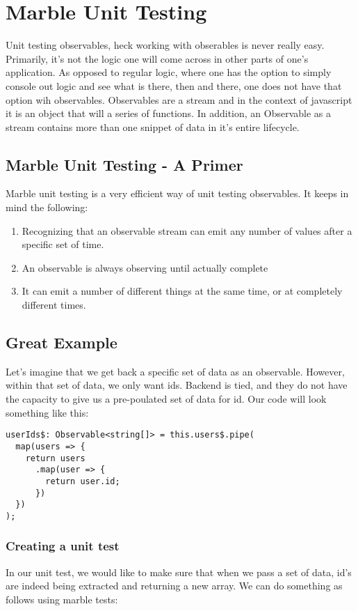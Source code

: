 
\chapter{ Marble Unit Testing }

Unit testing observables, heck working with obserables is never really easy.
Primarily, it's not the logic one will come across in other parts of one's
application. As opposed to regular logic, where one has the option to simply
console out logic and see what is there, then and there, one does not have that
option wih observables. Observables are a stream and in the context of
javascript it is an object that will a series of functions. In addition, an
Observable as a stream contains more than one snippet of data in it's entire
lifecycle.

\section{ Marble Unit Testing - A Primer }
Marble unit testing is a very efficient way of unit testing observables. It
keeps in mind the following:
\begin{enumerate}
  \item Recognizing that an observable stream can emit any number of values
  after a specific set of time.
  \item An observable is always observing until actually complete
  \item It can emit a number of different things at the same time, or at
  completely different times.
\end{enumerate}

\section{ Great Example }
Let's imagine that we get back a specific set of data as an observable. However,
within that set of data, we only want ids. Backend is tied, and they do not have
the capacity to give us a pre-poulated set of data for id. Our code will look
something like this:
\begin{lstlisting}
userIds$: Observable<string[]> = this.users$.pipe(
  map(users => {
    return users
      .map(user => {
        return user.id;
      })
  })
);
\end{lstlisting}

\subsection{Creating a unit test}
In our unit test, we would like to make sure that when we pass a set of data,
id's are indeed being extracted and returning a new array. We can do something
as follows using marble tests:

